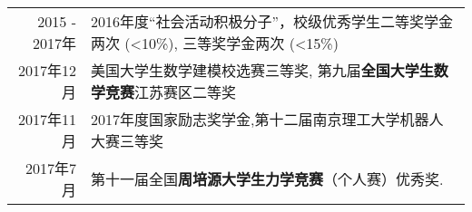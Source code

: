 %
%




\begin{tabular}{rl}	
	2015 - 2017年 & 2016年度“社会活动积极分子”，校级优秀学生二等奖学金两次 (<10\%), 三等奖学金两次 (<15\%)\\
	2017年12月 & 美国大学生数学建模校选赛三等奖, 第九届\textbf{全国大学生数学竞赛}江苏赛区二等奖\\
	2017年11月 & 2017年度国家励志奖学金,第十二届南京理工大学机器人大赛三等奖\\%
	2017年7月 & 第十一届全国\textbf{周培源大学生力学竞赛}（个人赛）优秀奖.\\%
\end{tabular}

